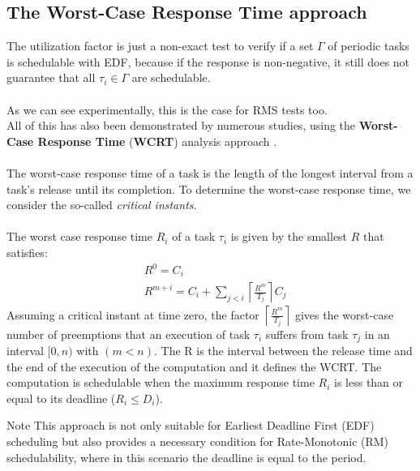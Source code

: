 \documentclass[10pt]{article}
\begin{document}
\subsection{The Worst-Case Response Time approach}
The utilization factor is just a non-exact test to verify if a set $\Gamma$ of periodic tasks is schedulable with EDF, because if the response is non-negative, it still does not guarantee that all $\tau_i \in \Gamma$ are schedulable.\\\\
As we can see experimentally, this is the case for RMS tests too.
\\All of this has also been demonstrated by numerous studies, using the \textbf{Worst-Case Response Time} (\textbf{WCRT}) analysis approach \cite{10.1093/comjnl/29.5.390}. \\\\
The worst-case response time of a task is the length of the longest interval from a task’s release until its completion. To determine the worst-case response time, we consider the so-called \textit{critical instants}\cite{10.1145/321738.321743}.\\\\
The worst case response time $R_i$ of a task $\tau_i$ is given by the smallest $R$ that satisfies:
\begin{equation*}
\begin{split}
    &R^0 = C_i\\
    &R^{m+i} = C_i + \sum_{j<i} \left\lceil \frac{R^{m}}{T_j} \right\rceil C_j
\end{split}
\end{equation*}
Assuming a critical instant at time zero, the factor $\left\lceil \frac{R^{m}}{T_j} \right\rceil$ gives the worst-case number of preemptions that an execution of task $\tau_i$ suffers from task $\tau_j$ in an interval $[0, n)$ with $( m < n )$. The R is the interval between the release time and the end of the execution of the computation and it defines the WCRT.
The computation is schedulable when the maximum response time
$R_i$ is less than or equal to its deadline ($R_i \leq D_i$). \\
\begin{example}{Note}
This approach is not only suitable for Earliest Deadline First (EDF) scheduling but also provides a necessary condition for Rate-Monotonic (RM) schedulability, where in this scenario the deadline is equal to the period.
\end{example}
\end{document}
